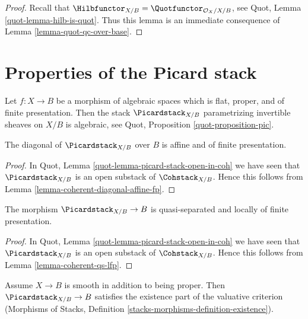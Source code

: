 \begin{proof}
Recall that $\Hilbfunctor_{X/B} = \Quotfunctor_{\mathcal{O}_X/X/B}$, see
Quot, Lemma \ref{quot-lemma-hilb-is-quot}.
Thus this lemma is an immediate consequence of
Lemma \ref{lemma-quot-qc-over-base}.
\end{proof}









\section{Properties of the Picard stack}
\label{section-picard-stack}

\noindent
Let $f : X \to B$ be a morphism of algebraic spaces which is flat,
proper, and of finite presentation. Then the stack
$\Picardstack_{X/B}$ parametrizing invertible sheaves on $X/B$
is algebraic, see Quot, Proposition \ref{quot-proposition-pic}.

\begin{lemma}
\label{lemma-pic-diagonal-affine-fp}
The diagonal of $\Picardstack_{X/B}$ over $B$ is affine
and of finite presentation.
\end{lemma}

\begin{proof}
In Quot, Lemma \ref{quot-lemma-picard-stack-open-in-coh} we have seen that
$\Picardstack_{X/B}$ is an open substack of
$\Cohstack_{X/B}$. Hence this follows from
Lemma \ref{lemma-coherent-diagonal-affine-fp}.
\end{proof}

\begin{lemma}
\label{lemma-pic-qs-lfp}
The morphism $\Picardstack_{X/B} \to B$ is quasi-separated and
locally of finite presentation.
\end{lemma}

\begin{proof}
In Quot, Lemma \ref{quot-lemma-picard-stack-open-in-coh} we have seen that
$\Picardstack_{X/B}$ is an open substack of
$\Cohstack_{X/B}$. Hence this follows from
Lemma \ref{lemma-coherent-qs-lfp}.
\end{proof}

\begin{lemma}
\label{lemma-pic-existence-part}
Assume $X \to B$ is smooth in addition to being proper.
Then $\Picardstack_{X/B} \to B$ satisfies the existence part
of the valuative criterion (Morphisms of Stacks, Definition
\ref{stacks-morphisms-definition-existence}).
\end{lemma}

